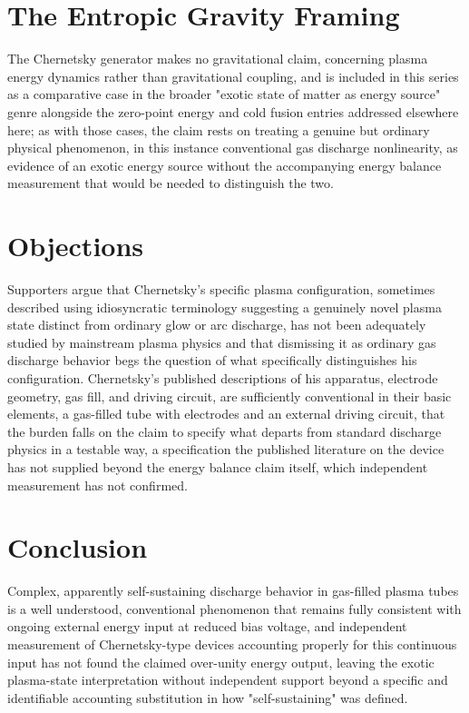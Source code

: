 \documentclass[11pt]{article}
\begin{document}
\section{The Entropic Gravity Framing}

The Chernetsky generator makes no gravitational claim, concerning plasma energy dynamics rather than gravitational coupling, and is included in this series as a comparative case in the broader "exotic state of matter as energy source" genre alongside the zero-point energy and cold fusion entries addressed elsewhere here; as with those cases, the claim rests on treating a genuine but ordinary physical phenomenon, in this instance conventional gas discharge nonlinearity, as evidence of an exotic energy source without the accompanying energy balance measurement that would be needed to distinguish the two.

\section{Objections}

Supporters argue that Chernetsky's specific plasma configuration, sometimes described using idiosyncratic terminology suggesting a genuinely novel plasma state distinct from ordinary glow or arc discharge, has not been adequately studied by mainstream plasma physics and that dismissing it as ordinary gas discharge behavior begs the question of what specifically distinguishes his configuration. Chernetsky's published descriptions of his apparatus, electrode geometry, gas fill, and driving circuit, are sufficiently conventional in their basic elements, a gas-filled tube with electrodes and an external driving circuit, that the burden falls on the claim to specify what departs from standard discharge physics in a testable way, a specification the published literature on the device has not supplied beyond the energy balance claim itself, which independent measurement has not confirmed.

\section{Conclusion}

Complex, apparently self-sustaining discharge behavior in gas-filled plasma tubes is a well understood, conventional phenomenon that remains fully consistent with ongoing external energy input at reduced bias voltage, and independent measurement of Chernetsky-type devices accounting properly for this continuous input has not found the claimed over-unity energy output, leaving the exotic plasma-state interpretation without independent support beyond a specific and identifiable accounting substitution in how "self-sustaining" was defined.
\end{document}
